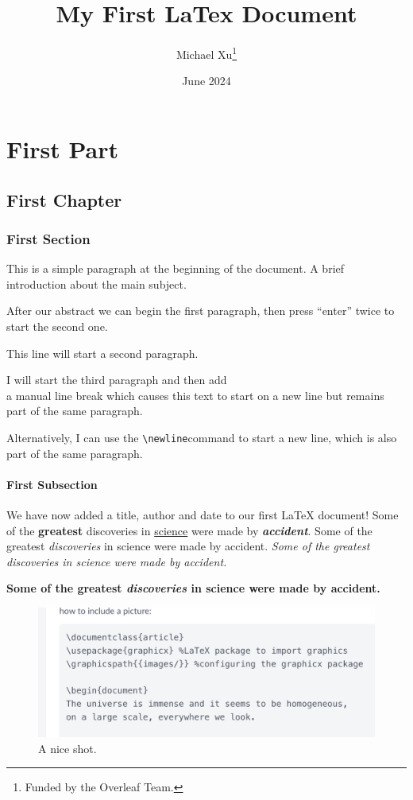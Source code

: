 \documentclass[12pt]{book}
\title{My First LaTex Document}
\author{Michael Xu\thanks{Funded by the Overleaf Team.}}
\date{June 2024}
\begin{document}
\maketitle
\tableofcontents

\part{First Part}

\chapter{First Chapter}

\section{First Section}

This is a simple paragraph at the beginning of the document. A brief introduction about the main subject.

After our abstract we can begin the first paragraph, then press ``enter'' twice to start the second one.

This line will start a second paragraph.

I will start the third paragraph and then add \\ a manual line break which causes this text to start on a new line but remains part of the same paragraph. 

Alternatively, I can use the \verb~\newline~\newline command to start a new line, which is also part of the same paragraph.

\subsection{First Subsection}

We have now added a title, author and date to our first \LaTeX{} document!
Some of the \textbf{greatest} discoveries in \underline{science} 
were made by \textbf{\textit{accident}}.
Some of the greatest \emph{discoveries} in science 
were made by accident.
\textit{Some of the greatest \emph{discoveries} 
in science were made by accident.}

\textbf{Some of the greatest \emph{discoveries} 
in science were made by accident.}

\begin{figure}[ht]
    \centering
    \includegraphics[width=0.80\linewidth]{screenshot}
    \caption{A nice shot.}
    \label{fig:universe}
\end{figure}
\end{document}
